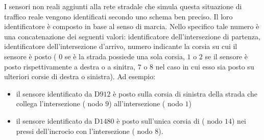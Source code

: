 I sensori non reali aggiunti alla rete stradale che simula questa situazione di traffico reale vengono identificati secondo uno schema ben preciso. Il loro identificatore è composto in base al senso di marcia. Nello specifico tale numero è una concatenazione dei seguenti valori: identificatore dell'intersezione di partenza, identificatore dell'intersezione d'arrivo, numero indicante la corsia su cui il sensore è posto (\ie{} $0$ se è la strada possiede una sola corsia, $1$ o $2$ se il sensore è posto rispettivamente a destra o a sinitra, $7$ o $8$ nel caso in cui esso sia posto su ulteriori corsie di destra o sinistra). Ad esempio:
\begin{itemize}
\item il sensore identificato da D$912$ è posto sulla corsia di sinistra della strada che collega l'intersezione  (\ie{} nodo $9$) all'intersezione  (\ie{} nodo $1$)
\item il sensore identificato da D$1480$ è posto sull'unica corsia di  (\ie{} nodo $14$) nei pressi dell'incrocio con l'intersezione  (\ie{} nodo $8$).
\end{itemize}

